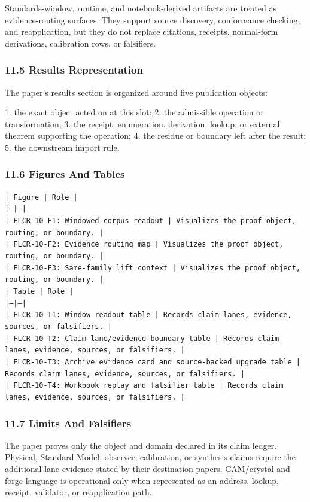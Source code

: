 \documentclass[11pt]{article}
\begin{document}
Standards-window, runtime, and notebook-derived artifacts are treated
as evidence-routing surfaces. They support source discovery, conformance
checking, and reapplication, but they do not replace citations, receipts,
normal-form derivations, calibration rows, or falsifiers.

\subsubsection*{11.5 Results Representation}

The paper's results section is organized around five publication objects:

1. the exact object acted on at this slot;
2. the admissible operation or transformation;
3. the receipt, enumeration, derivation, lookup, or external theorem supporting
   the operation;
4. the residue or boundary left after the result;
5. the downstream import rule.

\subsubsection*{11.6 Figures And Tables}

\noindent\texttt{| Figure | Role |}\\
\noindent\texttt{|---|---|}\\
\noindent\texttt{| FLCR-10-F1: Windowed corpus readout | Visualizes the proof object, routing, or boundary. |}\\
\noindent\texttt{| FLCR-10-F2: Evidence routing map | Visualizes the proof object, routing, or boundary. |}\\
\noindent\texttt{| FLCR-10-F3: Same-family lift context | Visualizes the proof object, routing, or boundary. |}\\

\noindent\texttt{| Table | Role |}\\
\noindent\texttt{|---|---|}\\
\noindent\texttt{| FLCR-10-T1: Window readout table | Records claim lanes, evidence, sources, or falsifiers. |}\\
\noindent\texttt{| FLCR-10-T2: Claim-lane/evidence-boundary table | Records claim lanes, evidence, sources, or falsifiers. |}\\
\noindent\texttt{| FLCR-10-T3: Archive evidence card and source-backed upgrade table | Records claim lanes, evidence, sources, or falsifiers. |}\\
\noindent\texttt{| FLCR-10-T4: Workbook replay and falsifier table | Records claim lanes, evidence, sources, or falsifiers. |}\\

\subsubsection*{11.7 Limits And Falsifiers}

The paper proves only the object and domain declared in its claim ledger.
Physical, Standard Model, observer, calibration, or synthesis claims require
the additional lane evidence stated by their destination papers. CAM/crystal
and forge language is operational only when represented as an address, lookup,
receipt, validator, or reapplication path.
\end{document}
